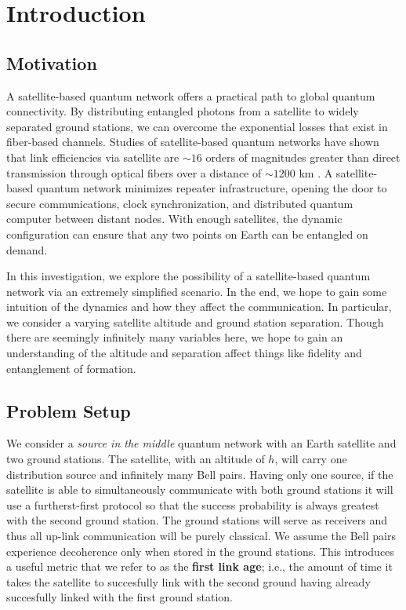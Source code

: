 \chapter{Introduction}


\section{Motivation}

A satellite-based quantum network offers a practical path to global quantum connectivity. By distributing entangled photons from a satellite to widely separated ground stations, we can overcome the exponential losses that exist in fiber-based channels. Studies of satellite-based quantum networks have shown that link efficiencies via satellite are  $\sim16$ orders of magnitudes greater than direct transmission through optical fibers over a distance of $\sim1200$ km \cite{lu2022}. A satellite-based quantum network minimizes repeater infrastructure, opening the door to secure communications, clock synchronization, and distributed quantum computer between distant nodes. With enough satellites, the dynamic configuration can ensure that any two points on Earth can be entangled on demand.

In this investigation, we explore the possibility of a satellite-based quantum network via an extremely simplified scenario. In the end, we hope to gain some intuition of the dynamics and how they affect the communication. In particular, we consider a varying satellite altitude and ground station separation. Though there are seemingly infinitely many variables here, we hope to gain an understanding of the altitude and separation affect things like fidelity and entanglement of formation.


\section{Problem Setup}

We consider a \textit{source in the middle} quantum network with an Earth satellite and two ground stations. The satellite, with an altitude of $h$, will carry one distribution source and infinitely many Bell pairs. Having only one source, if the satellite is able to simultaneously communicate with both ground stations it will use a furtherst-first protocol so that the success probability is always greatest with the second ground station. The ground stations will serve as receivers and thus all up-link communication will be purely classical. We assume the Bell pairs experience decoherence only when stored in the ground stations. This introduces a useful metric that we refer to as the \textbf{first link age}; i.e., the amount of time it takes the satellite to succesfully link with the second ground having already succesfully linked with the first ground station.

